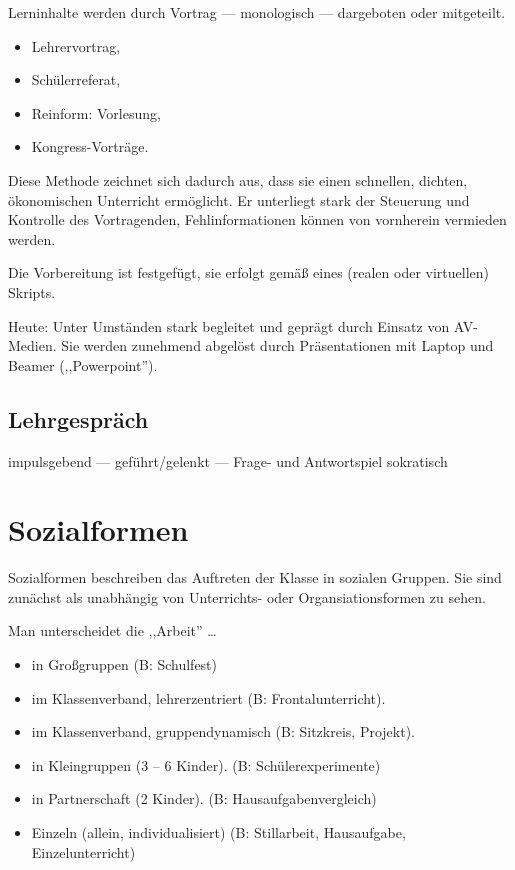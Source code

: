 Lerninhalte werden durch Vortrag --- monologisch ---
dargeboten oder mitgeteilt.

\begin{beisp}
	\begin{itemize}
\item Lehrervortrag,
\item Sch\"{u}lerreferat,
\item Reinform: Vorlesung,
\item Kongress-Vortr\"{a}ge.
\end{itemize}
\end{beisp}


Diese Methode zeichnet sich dadurch aus, dass sie
einen schnellen, dichten, \"{o}konomischen Unterricht erm\"{o}glicht.
Er unterliegt stark der Steuerung und Kontrolle des Vortragenden,
Fehlinformationen k\"{o}nnen von vornherein vermieden werden.

\bip
Die Vorbereitung ist festgef\"{u}gt, sie erfolgt gem\"{a}{\ss} eines
(realen oder virtuellen) Skripts.

\bip
Heute: Unter Umst\"{a}nden stark begleitet und gepr\"{a}gt durch
Einsatz von AV-Medien. Sie werden zunehmend abgel\"{o}st durch
Pr\"{a}sentationen mit Laptop und Beamer (,,Powerpoint'').


\subsection{Lehrgespr\"{a}ch}
impulsgebend --- gef\"{u}hrt/gelenkt --- Frage- und Antwortspiel sokratisch


\bip\bip
\section{Sozialformen}\label{Sozial}

Sozialformen beschreiben das Auftreten der Klasse in sozialen
Gruppen.
Sie sind zun\"{a}chst als unabh\"{a}ngig von Unterrichts- oder
Organsiations\-formen zu sehen.

Man unterscheidet die ,,Arbeit'' \dots
\begin{itemize}
\item in Gro{\ss}gruppen (B: Schulfest)
\item im Klassen\-verband, lehrerzentriert (B: Frontalunterricht).
\item im Klassen\-verband, gruppendynamisch (B: Sitzkreis, Projekt).
\item in Kleingruppen (3 -- 6 Kinder). (B: Sch\"{u}lerexperimente)
\item in Partnerschaft (2 Kinder). (B: Hausaufgabenvergleich)
\item Einzeln (allein, individualisiert)
(B: Stillarbeit, Hausaufgabe, Einzelunterricht)
\end{itemize}

